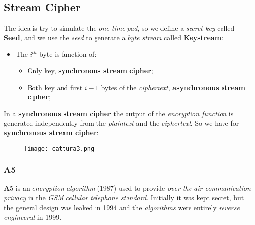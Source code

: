 \documentclass{article}
\begin{document}
\subsection{Stream Cipher}
The idea is try to simulate the \emph{one-time-pad}, so we define a \emph{secret key} called \textbf{Seed}, and we use the \emph{seed} to generate a \emph{byte stream} called \textbf{Keystream}:
\begin{itemize}
\item The $i^{th}$ byte is function of:
\begin{itemize}
\item Only key, \textbf{synchronous stream cipher};
\item Both key and first $i-1$ bytes of the \emph{ciphertext}, \textbf{asynchronous stream cipher};
\end{itemize}
\end{itemize}
In a \textbf{synchronous stream cipher} the output of the \emph{encryption function} is generated independently from the \emph{plaintext} and the \emph{ciphertext}. So we have for \textbf{synchronous stream cipher}:
\begin{figure}[H]
  \centering
  \texttt{[image: cattura3.png]}
\end{figure}
\subsubsection{A5}
\textbf{A}5 is an \emph{encryption algorithm} (1987) used to provide \emph{over-the-air communication privacy} in the \emph{GSM cellular telephone standard}. Initially it was kept secret, but the general design was leaked in 1994 and the \emph{algorithms} were entirely \emph{reverse engineered} in 1999. 
\end{document}
